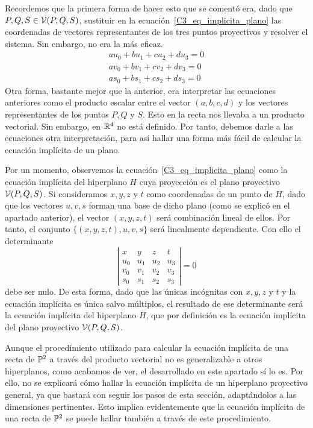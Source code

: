 Recordemos que la primera forma de hacer esto que se comentó era, dado que $P,Q,S\in \mathcal{V}(P,Q,S)$, sustituir en la ecuación~\eqref{C3_eq_implicita_plano} las coordenadas de vectores representantes de los tres puntos proyectivos y resolver el sistema. Sin embargo, no era la más eficaz.
\begin{equation}
	\begin{split}
		au_0+bu_1+cu_2+du_3=0\\
		av_0+bv_1+cv_2+dv_3=0\\
		as_0+bs_1+cs_2+ds_3=0
	\end{split}
\end{equation}
Otra forma, bastante mejor que la anterior, era interpretar las ecuaciones anteriores como el producto escalar entre el vector $(a,b,c,d)$ y los vectores representantes de los puntos $P,Q$ y $S$. Esto en la recta nos llevaba a un producto vectorial. Sin embargo, en $\mathbb{R}^4$ no está definido. Por tanto, debemos darle a las ecuaciones otra interpretación, para así hallar una forma más fácil de calcular la ecuación implícita de un plano. 

Por un momento, observemos la ecuación~\eqref{C3_eq_implicita_plano} como la ecuación implícita del hiperplano $H$ cuya proyección es el plano proyectivo $\mathcal{V}(P,Q,S)$. Si consideramos $x,y,z$ y $t$ como coordenadas de un punto de $H$, dado que los vectores $u,v,s$ forman una base de dicho plano (como se explicó en el apartado anterior), el vector $(x,y,z,t)$ será combinación lineal de ellos. Por tanto, el conjunto $\{(x,y,z,t),u,v,s\}$ será linealmente dependiente. Con ello el determinante
\begin{equation}
	\left| \begin{array}{cccc}
	x & y & z& t\\
	u_0 & u_1 & u_2 & u_3\\
	v_0 & v_1 & v_2 & v_3\\
	s_0 & s_1 & s_2 & s_3
	\end{array}\right| =0
\end{equation}
debe ser nulo. De esta forma, dado que las únicas incógnitas con $x,y,z$ y $t$ y la ecuación implícita es única salvo múltiplos, el resultado de ese determinante será la ecuación implícita del hiperplano $H$, que por definición es la ecuación implícita del plano proyectivo $\mathcal{V}(P,Q,S)$.

\begin{obs}
	Aunque el procedimiento utilizado para calcular la ecuación implícita de una recta de $\mathbb{P}^2$ a través del producto vectorial no es generalizable a otros hiperplanos, como acabamos de ver, el desarrollado en este apartado sí lo es. Por ello, no se explicará cómo hallar la ecuación implícita de un hiperplano proyectivo general, ya que bastará con seguir los pasos de esta sección, adaptándolos a las dimensiones pertinentes. Esto implica evidentemente que la ecuación implícita de una recta de $\mathbb{P}^2$ se puede hallar también a través de este procedimiento.
\end{obs}

